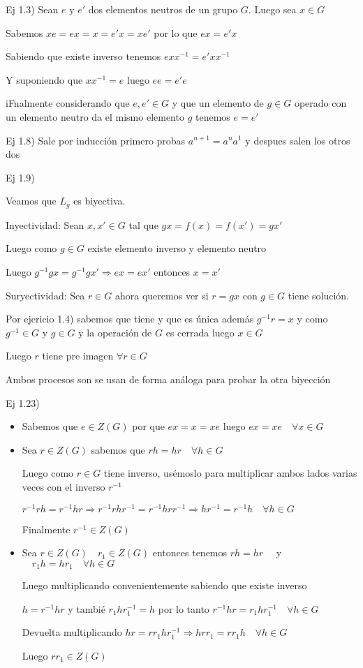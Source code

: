 \documentclass[12pt]{article}
\begin{document}
Ej 1.3)
Sean $e$ y $e'$ dos elementos neutros de un grupo $G$. Luego sea $x \in G$

Sabemos $xe = ex = x = e'x = xe'$ por lo que $ex = e'x$ 

Sabiendo que existe inverso tenemos $exx^{-1} = e'xx^{-1}$

Y suponiendo que $xx^{-1} = e$ luego $ee = e'e$

iFnalmente considerando que $e, e' \in G$ y que un elemento de $g \in G$ operado con un elemento neutro da el mismo elemento $g$ tenemos $e = e'$

Ej 1.8) Sale por inducción primero probas $a^{n + 1} = a^{n}a^{1}$ y despues salen los otros dos


Ej 1.9)

Veamos que $L_{g}$ es biyectiva.

Inyectividad: Sean $x , x' \in G$ tal que $gx = f(x) = f(x') = gx'$

Luego como $g \in G$ existe elemento inverso y elemento neutro

Luego $g^{-1}gx = g^{-1}gx' \Rightarrow ex = ex' $ entonces $x = x'$

Suryectividad: Sea $r \in G$ ahora queremos ver si $r = gx$ con $ g \in G$ tiene solución.

Por ejericio 1.4) sabemos que tiene y que es única además $g^{-1}r = x$ y como $g^{-1} \in G$ y $g \in G$ y la operación de $G$ es cerrada luego $x \in G$ 

Luego $r$ tiene pre imagen $\forall r \in G$ 

Ambos procesos son se usan de forma análoga para probar la otra biyección

Ej 1.23) 
\begin{itemize}
  \item Sabemos que $e \in Z(G)$ por que $ex = x = xe$ luego $ex = xe \quad \forall x \in G$
  \item Sea $r \in Z(G)$ sabemos que $rh = hr \quad \forall h \in G$ 

    Luego como $r \in G$ tiene inverso, usémoslo para multiplicar ambos lados varias veces con el inverso $r^{-1}$

    $r^{-1}rh = r^{-1}hr \Rightarrow r^{-1}rhr^{-1} = r^{-1}hrr^{-1} \Rightarrow  hr^{-1} = r^{-1}h \quad \forall h \in G$
  
    Finalmente $r^{-1} \in Z(G)$

  \item Sea $r \in Z(G) \quad r_{1} \in Z(G)$ entonces tenemos $rh =hr \quad$ y $\quad r_{1}h = h r_{1} \quad \forall h \in G$ 

    Luego multiplicando convenientemente sabiendo que existe inverso 

    $h = r^{-1}hr$ y tambié $r_{1}hr_{1}^{-1} = h$ por lo tanto $r^{-1}hr = r_{1}hr_{1}^{-1} \quad \forall h \in G$

    Devuelta multiplicando $hr = rr_{1}hr_{1}^{-1} \Rightarrow hrr_{1} = rr_{1}h \quad \forall h \in G$

    Luego $rr_{1} \in Z(G)$

\end{itemize}
\end{document}

